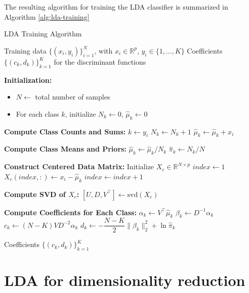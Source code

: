 \documentclass[a4paper,12pt]{article}
\begin{document}
The resulting algorithm for training the LDA classifier is summarized in Algorithm \ref{alg:lda-training}

\begin{algorithm}[htbp]
\caption{LDA Training Algorithm}\label{alg:lda-training}
\begin{algorithmic}[1]
\REQUIRE Training data $\{(x_i, y_i)\}_{i=1}^N$, with $x_i \in \mathbb{R}^p$, $y_i \in \{1,\ldots,K\}$
\ENSURE Coefficients $\{ (c_k, d_k) \}_{k=1}^K$ for the discriminant functions

\STATE \textbf{Initialization:}
\begin{itemize}
    \item $N \gets$ total number of samples
    \item For each class $k$, initialize $N_k \gets 0$, $\hat{\mu}_k \gets 0$
\end{itemize}

\STATE \textbf{Compute Class Counts and Sums:}
    \STATE $k \gets y_i$
    \STATE $N_k \gets N_k + 1$
    \STATE $\hat{\mu}_k \gets \hat{\mu}_k + x_i$
\ENDFOR

\STATE \textbf{Compute Class Means and Priors:}
    \STATE $\hat{\mu}_k \gets \hat{\mu}_k / N_k$
    \STATE $\hat{\pi}_k \gets N_k / N$
\ENDFOR  %

\STATE \textbf{Construct Centered Data Matrix:}
\STATE Initialize $X_c \in \mathbb{R}^{N \times p}$
\STATE $index \gets 1$
        \STATE $X_c(index, :) \gets x_i - \hat{\mu}_k$
        \STATE $index \gets index + 1$
    \ENDFOR
\ENDFOR

\STATE \textbf{Compute SVD of $X_c$:}
\STATE $[U, D, V^\top] \gets \text{svd}(X_c)$

\STATE \textbf{Compute Coefficients for Each Class:}
    \STATE $\alpha_k \gets V^\top \hat{\mu}_k$
    \STATE $\beta_k \gets D^{-1} \alpha_k$
    \STATE $c_k \gets (N - K) V D^{-2} \alpha_k$
    \STATE $d_k \gets -\dfrac{N - K}{2} \| \beta_k \|_2^2 + \ln \hat{\pi}_k$
\ENDFOR

\RETURN Coefficients $\{ (c_k, d_k) \}_{k=1}^K$
\end{algorithmic}
\end{algorithm}

\section{LDA for dimensionality reduction}
\end{document}
